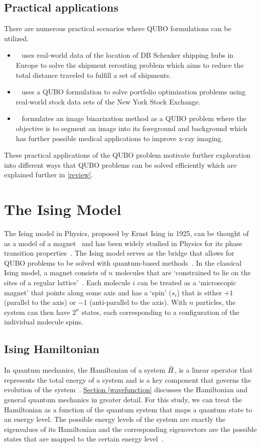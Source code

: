 \subsection{Practical applications}
There are numerous practical scenarios where QUBO formulations can be utilized. 
\begin{itemize}
    \item~\cite{b7} uses real-world data of the location of DB Schenker shipping hubs in Europe to solve the shipment rerouting problem which aims to reduce the total distance traveled to fulfill a set of shipments.
    \item~\cite{b8} uses a QUBO formulation to solve portfolio optimization problems using real-world stock data sets of the New York Stock Exchange.
    \item~\cite{b9} formulates an image binarization method as a QUBO problem where the objective is to segment an image into its foreground and background which has further possible medical applications to improve x-ray imaging.
\end{itemize}
These practical applications of the QUBO problem motivate further exploration into different ways that QUBO problems can be solved efficiently which are explained further in \autoref{review}.

\section{The Ising Model}
The Ising model in Physics, proposed by Ernst Ising in 1925, can be thought of as a model of a magnet~\cite{isingising} and has been widely studied in Physics for its phase transition properties~\cite{cipra1987introduction}. The Ising model serves as the bridge that allows for QUBO problems to be solved with quantum-based methods~\cite{b10}. In the classical Ising model, a magnet consists of $n$ molecules that are `constrained to lie on the sites of a regular lattice'~\cite{b11}. Each molecule $i$ can be treated as a `microscopic magnet' that points along some axis and has a `spin' ($s_i$) that is either $+1$ (parallel to the axis) or $-1$ (anti-parallel to the axis). With $n$ particles, the system can then have $2^n$ states, each corresponding to a configuration of the individual molecule spins.


\subsection{Ising Hamiltonian}\label{isinghamiltonian}
In quantum mechanics, the Hamiltonian of a system $\Hat{H}$, is a linear operator that represents the total energy of a system and is a key component that governs the evolution of the system~\cite{GriffithsSchroeter2018}. \hyperref[sdd_1]{Section \ref{wavefunction}} discusses the Hamiltonian and general quantum mechanics in greater detail. For this study, we can treat the Hamiltonian as a function of the quantum system that maps a quantum state to an energy level. The possible energy levels of the system are exactly the eigenvalues of its Hamiltonian and the corresponding eigenvectors are the possible states that are mapped to the certain energy level~\cite{b21}. 

